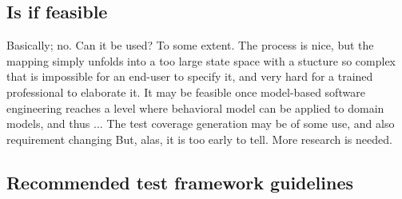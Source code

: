 

\subsection{Is if feasible}
Basically; no. Can it be used? To some extent. The process is nice, but the mapping simply unfolds into a too large state space with a stucture so complex that is impossible for an end-user to specify it, and very hard for a trained professional to elaborate it. It may be feasible once model-based software engineering reaches a level where behavioral model can be applied to domain models, and thus ...
The test coverage generation may be of some use, and also requirement changing
But, alas, it is too early to tell. More research is needed.


\subsection{Recommended test framework guidelines}


